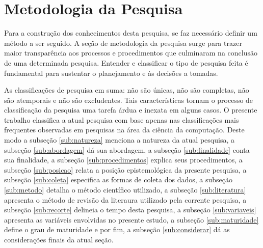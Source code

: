  

 


\section{Metodologia da Pesquisa}\label{sec:metodologia}

Para a construção dos conhecimentos desta pesquisa, se faz necessário definir um método a ser seguido. A seção de metodologia da pesquisa surge para trazer maior transparência aos processos e procedimentos que culminaram na conclusão de uma determinada pesquisa. Entender e classificar o tipo de pesquisa feita é fundamental para sustentar o planejamento e às decisões a tomadas.





As classificações de pesquisa em suma: não são únicas, não são completas, não são atemporais e não são excludentes. Tais características tornam o processo de classificação da pesquisa uma tarefa árdua e inexata em alguns casos. O presente trabalho classifica a atual pesquisa com base apenas nas classificações mais frequentes observadas em pesquisas na área da ciência da computação. Deste modo a subseção \ref{sub:natureza} menciona a natureza da atual pesquisa, a subseção \ref{sub:abordagem} dá sua abordagem, a subseção \ref{sub:finalidade} conta sua finalidade, a subseção \ref{sub:procedimentos} explica seus procedimentos, a subseção \ref{sub:posicao} relata a posição epistemológica da presente pesquisa, a subseção \ref{sub:coleta} especifica as formas de coleta dos dados, a subseção \ref{sub:metodo} detalha o método científico utilizado, a subseção \ref{sub:literatura} apresenta o método de revisão da literaura utilizado pela corrente pesquisa, a subseção \ref{sub:recorte} delineia o tempo desta pesquisa, a subseção \ref{sub:variaveis} apresenta as variáveis envolvidas no presente estudo, a subseção \ref{sub:maturidade} define o grau de maturidade e por fim, a subseção \ref{sub:considerar} dá as considerações finais da atual seção. 



